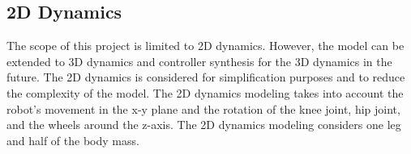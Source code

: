 \subsection{2D Dynamics}
The scope of this project is limited to 2D dynamics.
However, the model can be extended to 3D dynamics and controller synthesis for the 3D dynamics in the future.
The 2D dynamics is considered for simplification purposes and to reduce the complexity of the model.
The 2D dynamics modeling takes into account the robot's movement in the x-y plane and the rotation of the knee joint, hip joint, and the wheels around the z-axis.
The 2D dynamics modeling considers one leg and half of the body mass.
